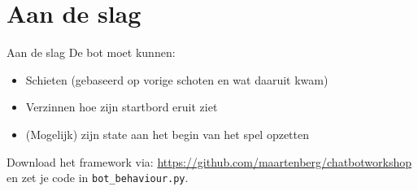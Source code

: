 \documentclass{beamer}
\begin{document}
\section{Aan de slag}
\begin{frame}{Aan de slag}
	De bot moet kunnen:
	\begin{itemize}
		\item Schieten (gebaseerd op vorige schoten en wat daaruit kwam)
		\item Verzinnen hoe zijn startbord eruit ziet
		\item (Mogelijk) zijn state aan het begin van het spel opzetten
	\end{itemize}

	Download het framework via: \url{https://github.com/maartenberg/chatbotworkshop} en zet je code in
	\texttt{bot\_behaviour.py}.
\end{frame}
\end{document}
